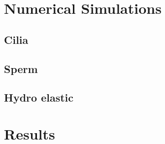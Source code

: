 \section{Numerical Simulations}
\subsection{Cilia}
\subsection{Sperm}
\subsection{Hydro elastic}
\section{Results}